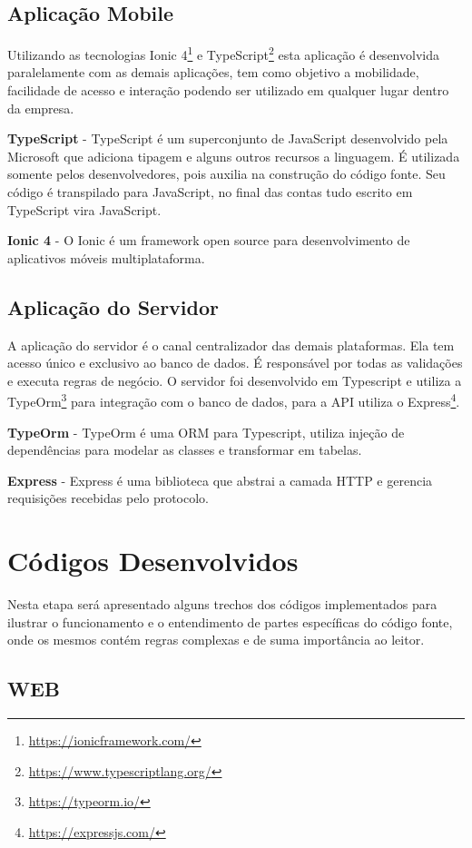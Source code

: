 \subsection{Aplicação Mobile}
Utilizando as tecnologias Ionic 4\footnote{\url{https://ionicframework.com/}} e TypeScript\footnote{\url{https://www.typescriptlang.org/}} esta aplicação é desenvolvida paralelamente com as demais aplicações, tem como objetivo a mobilidade, facilidade de acesso e interação podendo ser utilizado em qualquer lugar dentro da empresa.

{\textbf{TypeScript} - TypeScript é um superconjunto de JavaScript desenvolvido pela Microsoft que adiciona tipagem e alguns outros recursos a linguagem. É utilizada somente pelos desenvolvedores, pois auxilia na construção do código fonte. Seu código é transpilado para JavaScript, no final das contas tudo escrito em TypeScript vira JavaScript.}

{\textbf{Ionic 4} - O Ionic é um framework open source para desenvolvimento de aplicativos móveis multiplataforma.}

\subsection{Aplicação do Servidor}
A aplicação do servidor é o canal centralizador das demais plataformas. Ela tem acesso único e exclusivo ao banco de dados. É responsável por todas as validações e executa regras de negócio.
O servidor foi desenvolvido em Typescript e utiliza a TypeOrm\footnote{\url{https://typeorm.io/}} para integração com o banco de dados, para a API utiliza o Express\footnote{\url{https://expressjs.com/}}.

{\textbf{TypeOrm} - TypeOrm é uma ORM para Typescript, utiliza injeção de dependências para modelar as classes e transformar em tabelas.}

{\textbf{Express} - Express é uma biblioteca que abstrai a camada HTTP e gerencia requisições recebidas pelo protocolo.}


\section{Códigos Desenvolvidos} 

Nesta etapa será apresentado alguns trechos dos códigos implementados para ilustrar o funcionamento e o entendimento de partes específicas do código fonte, onde os mesmos contém regras complexas e de suma importância ao leitor.

\subsection{WEB}

